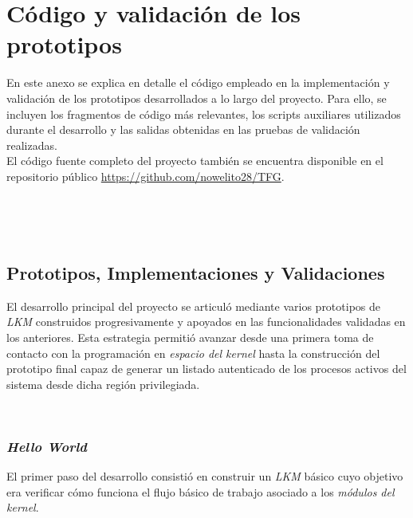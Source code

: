 \chapter{Código y validación de los prototipos}
\label{anexo:codigo-prototipos}

En este anexo se explica en detalle el código empleado en la implementación y validación de los prototipos desarrollados a lo largo del proyecto.
Para ello, se incluyen los fragmentos de código más relevantes, los scripts auxiliares utilizados durante el desarrollo y las salidas obtenidas en las pruebas de validación realizadas.\\

El código fuente completo del proyecto también se encuentra disponible en el repositorio público \url{https://github.com/nowelito28/TFG}.

\

\

\section{Prototipos, Implementaciones y Validaciones}

El desarrollo principal del proyecto se articuló mediante varios prototipos de \textit{LKM} construidos progresivamente y apoyados en las funcionalidades validadas en los anteriores.
Esta estrategia permitió avanzar desde una primera toma de contacto con la programación en \textit{espacio del kernel} hasta la construcción del prototipo final capaz de generar un listado autenticado de los procesos activos del sistema desde dicha región privilegiada.

\

\subsection{\textit{Hello World}}
\label{sec:proto-helloworld}

El primer paso del desarrollo consistió en construir un \textit{LKM} básico cuyo objetivo era verificar cómo funciona el flujo básico de trabajo asociado a los \textit{módulos del kernel}.\\

